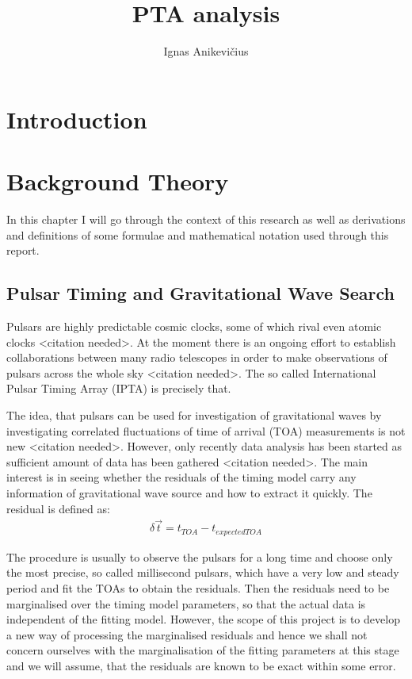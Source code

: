 \documentclass{scrreprt}
\author{Ignas Anikevičius}
\title{PTA analysis}
\begin{document}
    \maketitle
    \tableofcontents

    \chapter{Introduction}

    \chapter{Background Theory}

    In this chapter I will go through the context of this research as well as
    derivations and definitions of some formulae and mathematical notation used
    through this report.

    \section{Pulsar Timing and Gravitational Wave Search}

    Pulsars are highly predictable cosmic clocks, some of which rival even atomic
    clocks <citation needed>.
    At the moment there is an ongoing effort to establish collaborations between
    many radio telescopes in order to make observations of pulsars across the
    whole sky <citation needed>.
    The so called International Pulsar Timing Array (IPTA) is precisely that.

    The idea, that pulsars can be used for investigation of gravitational
    waves by investigating correlated fluctuations of time of arrival (TOA)
    measurements is not new <citation needed>.
    However, only recently data analysis has been started as sufficient amount of
    data has been gathered <citation needed>.
    The main interest is in seeing whether the residuals of the timing model
    carry any information of gravitational wave source and how to extract it
    quickly.
    The residual is defined as:
    \begin{align}
        \delta \vec{t} = t_{TOA} - t_{expected TOA}
    \end{align}

    The procedure is usually to observe the pulsars for a long time and choose
    only the most precise, so called millisecond pulsars, which have a very low
    and steady period and fit the TOAs to obtain the residuals.
    Then the residuals need to be marginalised over the timing model parameters,
    so that the actual data is independent of the fitting model.
    However, the scope of this project is to develop a new way of processing the
    marginalised residuals and hence we shall not concern ourselves with the
    marginalisation of the fitting parameters at this stage and we will assume,
    that the residuals are known to be exact within some error.
\end{document}
